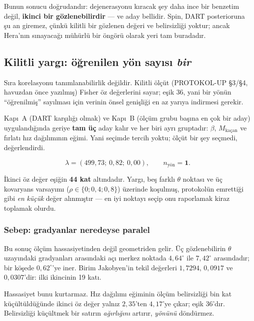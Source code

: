 \documentclass[12pt,a4paper]{article}
\begin{document}
Bunun sonucu doğrudandır: dejenerasyonu kıracak şey daha ince bir
benzetim değil, \textbf{ikinci bir gözlenebilirdir} --- ve aday
bellidir. Spin, DART posterioruna şu an giremez, çünkü kilitli bir
gözlenen değeri ve belirsizliği yoktur; ancak Hera'nın sınayacağı
mühürlü bir öngörü olarak yeri tam buradadır.

\subsection{Kilitli yargı: öğrenilen yön sayısı \emph{bir}}

Sıra korelasyonu tanımlanabilirlik değildir. Kilitli ölçüt
(PROTOKOL-UP §3/§4, havuzdan önce yazılmış) Fisher öz değerlerini
sayar; eşik 36, yani bir yönün ``öğrenilmiş'' sayılması için verinin
önsel genişliği en az yarıya indirmesi gerekir.

Kapı~A (DART karşılığı olmak) ve Kapı~B (ölçüm grubu başına en çok bir
aday) uygulandığında geriye \textbf{tam üç} aday kalır ve her biri ayrı
gruptadır: $\beta$, $M_{\text{kaçan}}$ ve fırlatı hız dağılımının eğimi.
Yani seçimde tercih yoktu; ölçüt bir şey seçmedi, değerlendirdi.

\begin{equation}
\lambda = (499{,}73;\ 0{,}82;\ 0{,}00), \qquad
n_{\text{yön}} = \mathbf{1} .
\label{esit:fisher}
\end{equation}

İkinci öz değer eşiğin \textbf{44 kat} altındadır. Yargı, beş farklı
$\theta$ noktası ve üç kovaryans varsayımı ($\rho\in\{0;0{,}4;0{,}8\}$)
üzerinde koşulmuş, protokolün emrettiği gibi \emph{en küçük} değer
alınmıştır --- en iyi noktayı seçip onu raporlamak kiraz toplamak
olurdu.

\subsubsection*{Sebep: gradyanlar neredeyse paralel}

Bu sonuç ölçüm hassasiyetinden değil geometriden gelir. Üç
gözlenebilirin $\theta$ uzayındaki gradyanları arasındaki açı merkez
noktada $4{,}64^{\circ}$ ile $7{,}42^{\circ}$ arasındadır; bir köşede
$0{,}62^{\circ}$'ye iner. Birim Jakobyen'in tekil değerleri
$1{,}7294$, $0{,}0917$ ve $0{,}0307$'dir: ilki ikincinin 19 katı.

Hassasiyet bunu kurtarmaz. Hız dağılımı eğiminin ölçüm belirsizliği
bin kat küçültüldüğünde ikinci öz değer yalnız $2{,}35$'ten $4{,}17$'ye
çıkar; eşik 36'dır. Belirsizliği küçültmek bir satırın \emph{ağırlığını}
artırır, \emph{yönünü} döndürmez.
\end{document}
